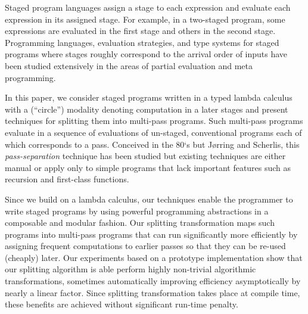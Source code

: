 Staged program languages assign a stage to each expression and
evaluate each expression in its assigned stage.  For example, in a
two-staged program, some expressions are evaluated in the first stage
and others in the second stage.  Programming languages, evaluation
strategies, and type systems for staged programs where stages roughly
correspond to the arrival order of inputs have been studied
extensively in the areas of partial evaluation and meta programming.

In this paper, we consider staged programs written in a typed lambda
calculus with a (``circle'') modality denoting computation in a later
stages and present techniques for splitting them into multi-pass
programs. Such multi-pass programs evaluate in a sequence of
evaluations of un-staged, conventional programs each of which
corresponds to a pass.  Conceived in the 80`s but J{\o}rring and
Scherlis, this {\em pass-separation} technique has been studied but
existing techniques are either manual or apply only to simple programs
that lack important features such as recursion and first-class
functions.



Since we build on a lambda calculus, our techniques enable the
programmer to write staged programs by using powerful programming
abstractions in a composable and modular fashion. Our splitting
transformation maps such programs into multi-pass programs that can
run significantly more efficiently by assigning frequent computations
to earlier passes so that they can be re-used (cheaply) later.  Our
experiments based on a prototype implementation show that our
splitting algorithm is able perform highly non-trivial algorithmic
transformations, sometimes automatically improving efficiency
asymptotically by nearly a linear factor.  Since splitting
transformation takes place at compile time, these benefits are
achieved without significant run-time penalty.





